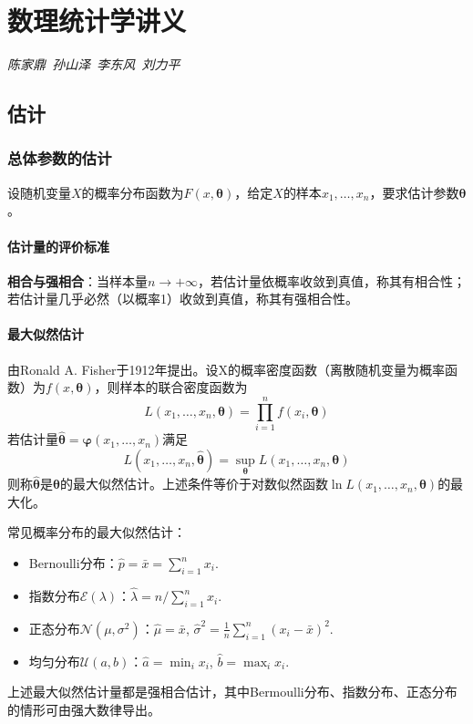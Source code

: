 
\chapter{数理统计学讲义}

\par \Large \emph{陈家鼎\ 孙山泽\ 李东风\ 刘力平} 

\normalsize

\section{估计}

\subsection{总体参数的估计}

设随机变量$X$的概率分布函数为$F(x,\boldsymbol{\theta})$，给定$X$的样本$x_1,\dots,x_n$，要求估计参数$\boldsymbol{\theta}$。

\subsubsection{估计量的评价标准}

\par \textbf{相合与强相合}：当样本量$n\to +\infty$，若估计量依概率收敛到真值，称其有相合性；若估计量几乎必然（以概率1）收敛到真值，称其有强相合性。

\subsubsection{最大似然估计}

\par 由Ronald A. Fisher于1912年提出。设X的概率密度函数（离散随机变量为概率函数）为$f(x,\boldsymbol{\theta})$，则样本的联合密度函数为
\begin{equation}
L(x_1,\dots,x_n,\boldsymbol{\theta})=\prod_{i=1}^n f(x_i,\boldsymbol{\theta})
\end{equation}
若估计量$\hat{\boldsymbol{\theta}}=\boldsymbol{\varphi}(x_1,\dots,x_n)$满足
\begin{equation}
L(x_1,\dots,x_n,\hat{\boldsymbol{\theta}})=\sup_{\boldsymbol{\theta}}L(x_1,\dots,x_n,\boldsymbol{\theta})
\end{equation}
则称$\hat{\boldsymbol{\theta}}$是${\boldsymbol{\theta}}$的最大似然估计。上述条件等价于对数似然函数$\ln L(x_1,\dots,x_n,\boldsymbol{\theta})$的最大化。

\par 常见概率分布的最大似然估计：
\begin{itemize}
\item Bernoulli分布：$\hat{p}=\bar{x}=\sum_{i=1}^n x_i$.
\item 指数分布$\mathcal{E}(\lambda)$：$\hat{\lambda}=n/\sum_{i=1}^n x_i$.
\item 正态分布$\mathcal{N}(\mu,\sigma^2)$：$\hat{\mu}=\bar{x}$, $\hat{\sigma}^2=\frac{1}{n}\sum_{i=1}^n (x_i-\bar{x})^2$.
\item 均匀分布$\mathcal{U}(a,b)$：$\hat{a}=\min_i x_i$, $\hat{b}=\max_i x_i$.
\end{itemize}
上述最大似然估计量都是强相合估计，其中Bermoulli分布、指数分布、正态分布的情形可由强大数律导出。


